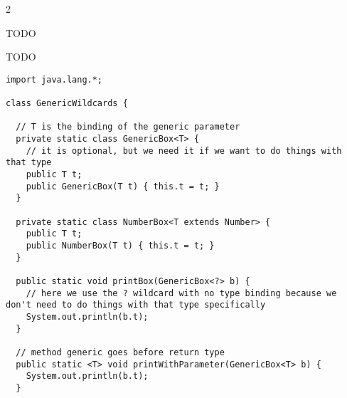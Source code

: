 \documentclass{article}
\def \columncount {2}
\renewcommand\labelitemi{\hspace{-1in}\tiny$\bullet$}
\renewcommand\labelitemii{\labelitemi}
\begin{document}
\begin{multicols}{\columncount}
\begin{outline}[longenum]




  \1 TODO

  \1 TODO
\0\begin{verbatim}
import java.lang.*;

class GenericWildcards {
  
  // T is the binding of the generic parameter
  private static class GenericBox<T> {
    // it is optional, but we need it if we want to do things with that type
    public T t;
    public GenericBox(T t) { this.t = t; }
  }

  private static class NumberBox<T extends Number> {
    public T t;
    public NumberBox(T t) { this.t = t; } 
  }

  public static void printBox(GenericBox<?> b) {
    // here we use the ? wildcard with no type binding because we don't need to do things with that type specifically
    System.out.println(b.t);
  }

  // method generic goes before return type
  public static <T> void printWithParameter(GenericBox<T> b) {
    System.out.println(b.t);
  }


\end{verbatim}
\end{outline}
\end{multicols}
\end{document}
